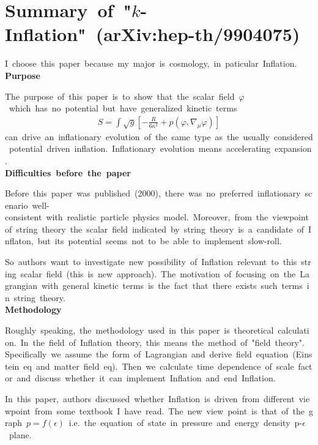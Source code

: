 \section{Summary\ of\ "$k$-Inflation"\ (arXiv:hep-th/9904075)}
I\ choose\ this\ paper\ because\ my\ major\ is\ cosmology,\ in\ paticular\ Inflation.\\
\textbf{Purpose}

The\ purpose\ of\ this\ paper\ is\ to\ show\ that\ the\ scalar\ field\ $\varphi$\ which\ has\ no\ potential\ but\ have\ generalized\ kinetic\ terms
\begin{align}
    S=\int \sqrt{g}\left[-\frac{R}{6\kappa^2}+p(\varphi,\nabla_{\mu}\varphi)\right]
\end{align}
can\ drive\ an\ inflationary\ evolution\ of\ the\ same\ type\ as\ the\ usually\ considered\ potential\ driven\ inflation.\ Inflationary\ evolution\ means\ accelerating\ expansion.\\
\textbf{Difficulties\ before\ the\ paper}

Before\ this\ paper\ was\ published\ (2000),\ there\ was\ no\ preferred\ inflationary\ scenario\ well-consistent\ with\ realistic\ particle\ physics\ model.\ Moreover,\ from\ the\ viewpoint\ of\ string\ theory\ the\ scalar\ field\ indicated\ by\ string\ theory\ is\ a\ candidate\ of\ Inflaton,\ but\ its\ potential\ seems\ not\ to\ be\ able\ to\ implement\ slow-roll.

So\ authors\ want\ to\ investigate\ new\ possibility\ of\ Inflation\ relevant\ to\ this\ string\ scalar\ field\ (this\ is\ new\ approach).\ The\ motivation\ of\ focusing\ on\ the\ Lagrangian\ with\ general\ kinetic\ terms\ is\ the\ fact\ that\ there\ exists\ such\ terms\ in\ string\ theory.\\
\textbf{Methodology}

Roughly\ speaking,\ the\ methodology\ used\ in\ this\ paper\ is\ theoretical\ calculation.\ In\ the\ field\ of\ Inflation\ theory,\ this\ means\ the\ method\ of\ "field\ theory".\ Specifically\ we\ assume\ the\ form\ of\ Lagrangian\ and\ derive\ field\ equation\ (Einstein\ eq\ and\ matter\ field\ eq).\ Then\ we\ calculate\ time\ dependence\ of\ scale\ factor\ and\ discuss\ whether\ it\ can\ implement\ Inflation\ and\ end\ Inflation.

In\ this\ paper,\ authors\ discussed\ whether\ Inflation\ is\ driven\ from\ different\ viewpoint\ from\ some\ textbook\ I\ have\ read.\ The\ new\ view\ point\ is\ that\ of\ the\ graph\ $p=f(\epsilon)$\ i.e.\ the\ equation\ of\ state\ in\ pressure\ and\ energy\ density\ p-$\epsilon$\ plane.

